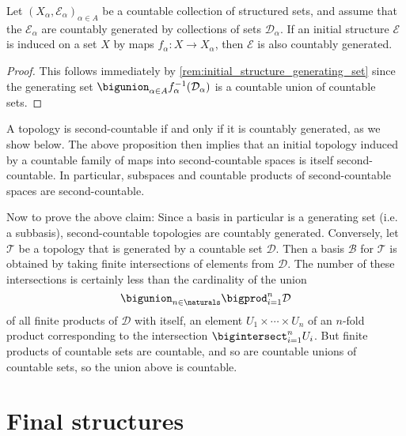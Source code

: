 \documentclass[article, a4paper, 11pt, oneside]{memoir}
\numberwithin{equation}{chapter}
\newcommand{\calT}{\mathcal{T}}
\newcommand{\calB}{\mathcal{B}}
\newcommand{\calE}{\mathcal{E}}
\newcommand{\calD}{\mathcal{D}}
\newcommand{\preim}{^{-1}}
\begin{document}
\begin{proposition}
    Let $(X_\alpha,\calE_\alpha)_{\alpha \in A}$ be a countable collection of structured sets, and assume that the $\calE_\alpha$ are countably generated by collections of sets $\calD_\alpha$. If an initial structure $\calE$ is induced on a set $X$ by maps $f_\alpha \colon X \to X_\alpha$, then $\calE$ is also countably generated.
\end{proposition}

\begin{proof}
    This follows immediately by \cref{rem:initial_structure_generating_set} since the generating set $\bigunion_{\alpha \in A} f_\alpha\preim(\calD_\alpha)$ is a countable union of countable sets.
\end{proof}


\begin{examplebreak}
    \label{ex:second_countable_space}
    A topology is second-countable if and only if it is countably generated, as we show below. The above proposition then implies that an initial topology induced by a countable family of maps into second-countable spaces is itself second-countable. In particular, subspaces and countable products of second-countable spaces are second-countable.
    
    Now to prove the above claim: Since a basis in particular is a generating set (i.e. a subbasis), second-countable topologies are countably generated. Conversely, let $\calT$ be a topology that is generated by a countable set $\calD$. Then a basis $\calB$ for $\calT$ is obtained by taking finite intersections of elements from $\calD$. The number of these intersections is certainly less than the cardinality of the union
    \begin{equation*}
        \bigunion_{n \in \naturals} \bigprod_{i=1}^n \calD
    \end{equation*}
    of all finite products of $\calD$ with itself, an element $U_1 \times \cdots \times U_n$ of an $n$-fold product corresponding to the intersection $\bigintersect_{i=1}^n U_i$. But finite products of countable sets are countable, and so are countable unions of countable sets, so the union above is countable.
\end{examplebreak}


\section{Final structures}
\end{document}
